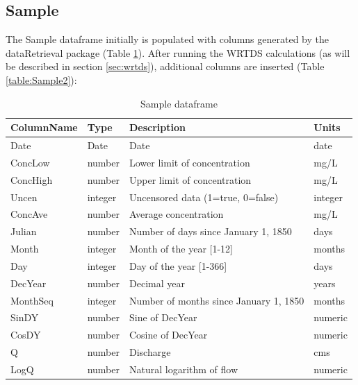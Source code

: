 \documentclass[a4paper,11pt]{article}\usepackage{graphicx, color}
\begin{document}
\FloatBarrier
\pagebreak


\subsection{Sample}
\label{sec:dataframesSample}
The Sample dataframe initially is populated with columns generated by the dataRetrieval package (Table \ref{table:Sample1}). After running the WRTDS calculations (as will be described in section \ref{sec:wrtds}), additional columns are inserted (Table \ref{table:Sample2}):

\begin{table}[!ht]
\begin{minipage}{\linewidth}
\centering
\caption{Sample dataframe} 
\label{table:Sample1}
\begin{tabular}{llll}
  \hline
ColumnName & Type & Description & Units \\ 
  \hline
Date & Date & Date & date \\ 
  ConcLow & number & Lower limit of concentration & mg/L \\ 
  ConcHigh & number & Upper limit of concentration & mg/L \\ 
  Uncen & integer & Uncensored data (1=true, 0=false) & integer \\ 
  ConcAve & number & Average concentration & mg/L \\ 
  Julian & number & Number of days since January 1, 1850 & days \\ 
  Month & integer & Month of the year [1-12] & months \\ 
  Day & integer & Day of the year [1-366] & days \\ 
  DecYear & number & Decimal year & years \\ 
  MonthSeq & integer & Number of months since January 1, 1850 & months \\ 
  SinDY & number & Sine of DecYear & numeric \\ 
  CosDY & number & Cosine of DecYear & numeric \\ 
  Q \footnotemark[1] & number & Discharge & cms \\ 
  LogQ \footnotemark[1] & number & Natural logarithm of flow & numeric \\ 
   \hline
\end{tabular}
\end{minipage}
\end{table}
\end{document}
